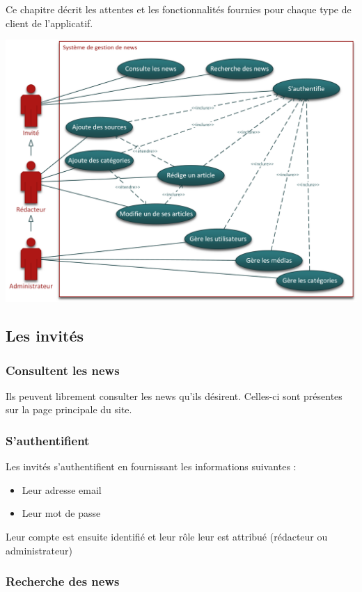 \documentclass{article}
\begin{document}
Ce chapitre décrit les attentes et les fonctionnalités fournies pour chaque type de client de l’applicatif.

\includegraphics[width=\textwidth]{use_cases}


\subsection{Les invités}

\subsubsection{Consultent les news}

Ils peuvent librement consulter les news qu'ils désirent. Celles-ci sont présentes sur la page principale du site.

\subsubsection{S'authentifient}

Les invités s'authentifient en fournissant les informations suivantes :
\begin{itemize}
\item Leur adresse email
\item Leur mot de passe
\end{itemize}

Leur compte est ensuite identifié et leur rôle leur est attribué (rédacteur ou administrateur)

\subsubsection{Recherche des news}
\end{document}
